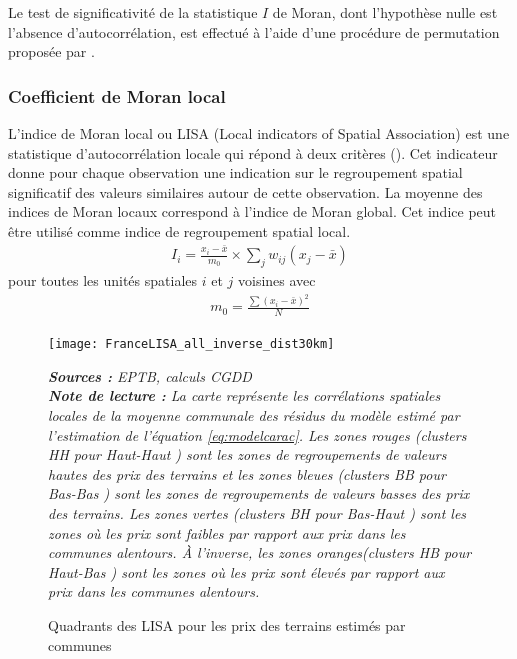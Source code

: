 \documentclass[10.5pt,a4paper]{article}
\begin{document}
{Le test de significativité de la statistique $I$ de Moran, dont l'hypothèse nulle est l'absence
d'autocorrélation, est effectué à l'aide d'une procédure de permutation proposée par
\cite{Anselin95}.\par

\subsubsection{Coefficient de Moran local}

L'indice de Moran local ou LISA (Local indicators of Spatial Association) est une statistique
d'autocorrélation locale qui répond à deux critères (\cite{Anselin95}). Cet indicateur donne pour
chaque observation une indication sur le regroupement spatial significatif des valeurs similaires
autour de cette observation. La moyenne des indices de Moran locaux correspond à l'indice de Moran
global. Cet indice peut être utilisé comme indice de regroupement spatial local.
\begin{eqnarray}
  I_{i}={\frac{x_{i}-\bar{x}}{m_0}}\times\sum_{j}w_{ij}(x_{j}-\bar{x})
\end{eqnarray}
pour toutes les unités spatiales $i$ et $j$ voisines avec \begin{eqnarray} m_0={\frac{\sum (x_i-\bar{x})^2}{N}}
\end{eqnarray}

\begin{figure}[!h]%
\begin{center}
\caption{Quadrants des LISA pour les prix des terrains estimés par communes}%
\label{}%
\texttt{[image: FranceLISA\_all\_inverse\_dist30km]}%
\end{center}

\scriptsize\textit{\textbf{Sources :} EPTB, calculs CGDD \\
\textbf{Note de lecture :} La carte représente les corrélations spatiales locales de la moyenne communale des résidus du modèle estimé par l'estimation de l'équation \ref{eq:modelcarac}.  Les zones rouges (clusters HH pour \og Haut-Haut \fg) sont les zones de regroupements de valeurs hautes des prix des terrains et les zones bleues (clusters BB pour \fg Bas-Bas \fg) sont les zones de regroupements de valeurs basses des prix des terrains. Les zones vertes (clusters BH pour \og Bas-Haut \fg) sont les zones où les prix sont faibles par rapport aux prix dans les communes alentours. \`{A} l'inverse, les zones oranges(clusters HB pour \og Haut-Bas \fg) sont les zones où les prix sont élevés par rapport aux prix dans les communes alentours.}
\end{figure}

}
\end{document}
